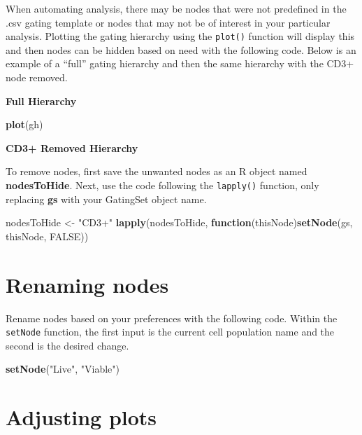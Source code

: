 \documentclass[]{book}
\newenvironment{Shaded}{\begin{snugshade}}{\end{snugshade}}
\newcommand{\ControlFlowTok}[1]{\textcolor[rgb]{0.13,0.29,0.53}{\textbf{#1}}}
\newcommand{\KeywordTok}[1]{\textcolor[rgb]{0.13,0.29,0.53}{\textbf{#1}}}
\newcommand{\NormalTok}[1]{#1}
\newcommand{\OtherTok}[1]{\textcolor[rgb]{0.56,0.35,0.01}{#1}}
\newcommand{\StringTok}[1]{\textcolor[rgb]{0.31,0.60,0.02}{#1}}
\begin{document}
When automating analysis, there may be nodes that were not predefined in the .csv gating template or nodes that may not be of interest in your particular analysis. Plotting the gating hierarchy using the \texttt{plot()} function will display this and then nodes can be hidden based on need with the following code. Below is an example of a ``full'' gating hierarchy and then the same hierarchy with the CD3+ node removed.

\textbf{Full Hierarchy}

\begin{Shaded}
\begin{Highlighting}[]
\KeywordTok{plot}\NormalTok{(gh)}
\end{Highlighting}
\end{Shaded}

\textbf{CD3+ Removed Hierarchy}

To remove nodes, first save the unwanted nodes as an R object named \textbf{nodesToHide}. Next, use the code following the \texttt{lapply()} function, only replacing \textbf{gs} with your GatingSet object name.

\begin{Shaded}
\begin{Highlighting}[]
\NormalTok{nodesToHide <-}\StringTok{ "CD3+"}
\KeywordTok{lapply}\NormalTok{(nodesToHide, }\ControlFlowTok{function}\NormalTok{(thisNode)}\KeywordTok{setNode}\NormalTok{(gs, thisNode, }\OtherTok{FALSE}\NormalTok{))}
\end{Highlighting}
\end{Shaded}

\hypertarget{renaming-nodes}{%
\section{Renaming nodes}\label{renaming-nodes}}

Rename nodes based on your preferences with the following code. Within the \texttt{setNode} function, the first input is the current cell population name and the second is the desired change.

\begin{Shaded}
\begin{Highlighting}[]
\KeywordTok{setNode}\NormalTok{(}\StringTok{"Live"}\NormalTok{, }\StringTok{"Viable"}\NormalTok{)}
\end{Highlighting}
\end{Shaded}

\hypertarget{adjusting-plots}{%
\section{Adjusting plots}\label{adjusting-plots}}
\end{document}
